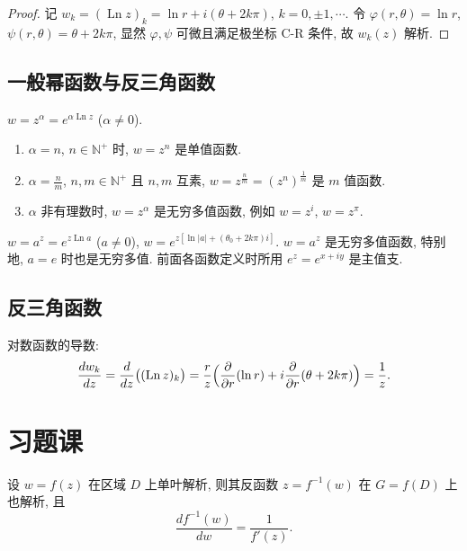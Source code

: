\documentclass[theorem=false,mathfont=none,openany,sub3section]{easybook}
\begin{document}
\begin{proof}
  记 $w_{k}=(\operatorname{Ln}z)_{k}=\ln r+i(\theta+2k\pi)$, $k=0,\pm1,\cdots$.
  令 $\varphi(r,\theta)=\ln r$, $\psi(r,\theta)=\theta+2k\pi$, 显然 $\varphi,\psi$ 可微且满足极坐标 C-R 条件, 故 $w_{k}(z)$ 解析.
\end{proof}

\subsection{一般幂函数与反三角函数}

\begin{definition}
  $w=z^{\alpha}=e^{\alpha\operatorname{Ln}z}$ ($\alpha\neq0$).\par
  \begin{enumerate}
    \item $\alpha=n$, $n\in\mathbb{N}^{+}$ 时, $w=z^{n}$ 是单值函数.
    \item $\alpha=\frac{n}{m}$, $n,m\in\mathbb{N}^{+}$ 且 $n,m$ 互素, $w=z^{\frac{n}{m}}=(z^{n})^{\frac{1}{m}}$ 是 $m$ 值函数.
    \item $\alpha$ 非有理数时, $w=z^{\alpha}$ 是无穷多值函数, 例如 $w=z^{i}$, $w=z^{\pi}$.
  \end{enumerate}
\end{definition}

\begin{definition}
  $w=a^{z}=e^{z\operatorname{Ln}a}$ ($a\neq0$), $w=e^{z[\ln|a|+(\theta_{0}+2k\pi)i]}$.
  $w=a^{z}$ 是无穷多值函数, 特别地, $a=e$ 时也是无穷多值.
  前面各函数定义时所用 $e^{z}=e^{x+iy}$ 是主值支.
\end{definition}

\subsection*{反三角函数}

\begin{remark}
  对数函数的导数:
  \[
  \frac{dw_{k}}{dz}=\frac{d}{dz}\bigl((\operatorname{Ln}z)_{k}\bigr)
  =\frac{r}{z}\Bigl(\frac{\partial}{\partial r}(\ln r)+i\frac{\partial}{\partial r}(\theta+2k\pi)\Bigr)=\frac{1}{z}.
  \]
\end{remark}

\newpage

\section{习题课}

\begin{example}
  设 $w=f(z)$ 在区域 $D$ 上单叶解析, 则其反函数 $z=f^{-1}(w)$ 在 $G=f(D)$ 上也解析, 且
  \[
  \frac{df^{-1}(w)}{dw}=\frac{1}{f'(z)}.
  \]
\end{example}
\end{document}
